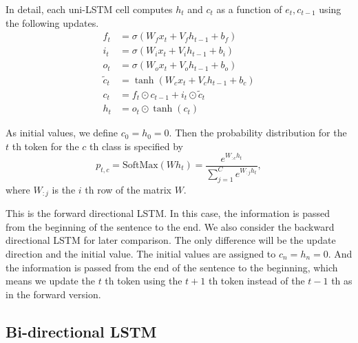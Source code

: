 \documentclass{article}
\begin{document}
In detail, each uni-LSTM cell computes $h_t$ and $c_t$ as a function of $e_t, c_{t-1}$ using the following updates. 
\begin{align} 
f_t & = \sigma(W_f x_t + V_f h_{t - 1} + b_f) \label{eq:1f}\\
i_t & = \sigma(W_i x_t + V_i h_{t - 1} + b_i) \label{eq:1i}\\
o_t & = \sigma(W_o x_t + V_o h_{t - 1} + b_o) \label{eq:1o}\\
\tilde{c}_t & = \tanh(W_c x_t + V_c h_{t - 1} + b_c) \\
c_t & = f_t \odot c_{t - 1} + i_t \odot \tilde{c}_t \label{eq:1c}\\
h_t & = o_t \odot \tanh(c_t)\label{eq:1h}
\end{align}

As initial values, we define $c_0=h_0=0$. 
Then the probability distribution for the $t$ th token for the $c$ th class is specified by 
\begin{equation}
p_{t, c} = \text{SoftMax}(W h_t) = \frac{e^{W_{:c} h_t}}{\sum_{j = 1} ^ C e^{W_{:j} h_t}},
\end{equation}
where $W_{:j}$ is the $i$ th row of the matrix $W$.

This is the forward directional LSTM. In this case, the information is passed from the beginning of the sentence to the end. We also consider the backward directional LSTM for later comparison. The only difference will be the update direction and the initial value. The initial values are assigned to $c_n=h_n=0$. And the information is passed from the end of the sentence to the beginning, which means we update the $t$ th token using the $t+1$ th token instead of the $t-1$ th as in the forward version.


\subsection{Bi-directional LSTM}
\end{document}
